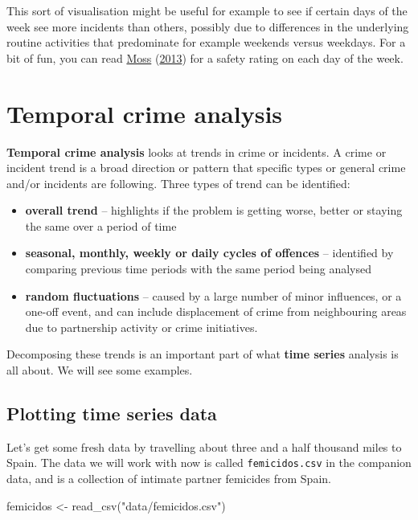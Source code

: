 \documentclass[
]{book}
\newenvironment{Shaded}{\begin{snugshade}}{\end{snugshade}}
\newcommand{\FunctionTok}[1]{\textcolor[rgb]{0.00,0.00,0.00}{#1}}
\newcommand{\NormalTok}[1]{#1}
\newcommand{\OtherTok}[1]{\textcolor[rgb]{0.56,0.35,0.01}{#1}}
\newcommand{\StringTok}[1]{\textcolor[rgb]{0.31,0.60,0.02}{#1}}
\providecommand{\tightlist}{%
  \setlength{\itemsep}{0pt}\setlength{\parskip}{0pt}}
\begin{document}
This sort of visualisation might be useful for example to see if certain days of the week see more incidents than others, possibly due to differences in the underlying routine activities that predominate for example weekends versus weekdays. For a bit of fun, you can read \protect\hyperlink{ref-Moss_2013}{Moss} (\protect\hyperlink{ref-Moss_2013}{2013}) for a safety rating on each day of the week.

\hypertarget{temporal-crime-analysis}{%
\section{Temporal crime analysis}\label{temporal-crime-analysis}}

\textbf{Temporal crime analysis} looks at trends in crime or incidents. A crime or incident trend is a broad direction or pattern that specific types or general crime and/or incidents are following. Three types of trend can be identified:

\begin{itemize}
\tightlist
\item
  \textbf{overall trend} -- highlights if the problem is getting worse, better or staying the same over a period of time
\item
  \textbf{seasonal, monthly, weekly or daily cycles of offences} -- identified by comparing previous time periods with the same period being analysed
\item
  \textbf{random fluctuations} -- caused by a large number of minor influences, or a one-off event, and can include displacement of crime from neighbouring areas due to partnership activity or crime initiatives.
\end{itemize}

Decomposing these trends is an important part of what \textbf{time series} analysis is all about. We will see some examples.

\hypertarget{plotting-time-series-data}{%
\subsection{Plotting time series data}\label{plotting-time-series-data}}

Let's get some fresh data by travelling about three and a half thousand miles to Spain. The data we will work with now is called \texttt{femicidos.csv} in the companion data, and is a collection of intimate partner femicides from Spain.

\begin{Shaded}
\begin{Highlighting}[]
\NormalTok{femicidos }\OtherTok{\textless{}{-}} \FunctionTok{read\_csv}\NormalTok{(}\StringTok{"data/femicidos.csv"}\NormalTok{)}
\end{Highlighting}
\end{Shaded}
\end{document}
